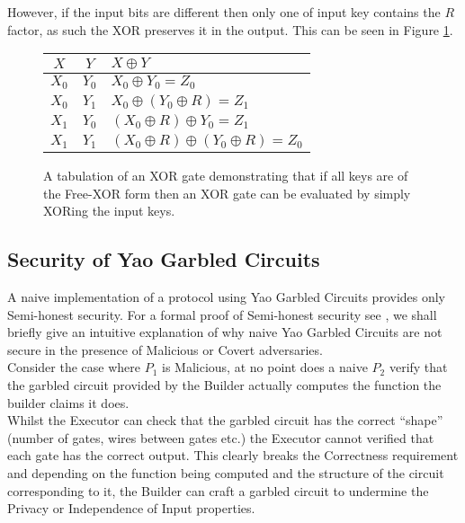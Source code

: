 \documentclass[ %
                    author={Nicholas Tutte},
                supervisor={Prof. Nigel Smart},
                    degree={MEng},
                     title={Secure Two Party Computation},
                  subtitle={A practical comparison of recent protocols},
                      type={Research - GG1K},
                      year={2015} ]{dissertation}
\begin{document}
				However, if the input bits are different then only one of input key contains the $R$ factor, as such the XOR preserves it in the output. This can be seen in Figure \ref{table:FREE_XOR_Demonstration}.
% 
				\begin{figure}[!ht]
					\begin{center}
						\begin{tabular}{c c | l }
							$X$ & $Y$ & $X \oplus Y$\\
							\hline
							$X_0$ & $Y_0$ & $X_0 \oplus Y_0 = Z_0$ \\
							$X_0$ & $Y_1$ & $X_0 \oplus (Y_0 \oplus R) = Z_1$ \\
							$X_1$ & $Y_0$ & $(X_0 \oplus R) \oplus Y_0 = Z_1$ \\
							$X_1$ & $Y_1$ & $(X_0 \oplus R) \oplus (Y_0 \oplus R) = Z_0$ \\
						\end{tabular}
					\end{center}
					\caption{A tabulation of an XOR gate demonstrating that if all keys are of the Free-XOR form then an XOR gate can be evaluated by simply XORing the input keys. \label{table:FREE_XOR_Demonstration}}
				\end{figure}

		\subsection{Security of Yao Garbled Circuits} \label{sub:YaoSecurity}
			A naive implementation of a protocol using Yao Garbled Circuits provides only Semi-honest security. For a formal proof of Semi-honest security see \cite{ProofOfYaoSecurity}, we shall briefly give an intuitive explanation of why naive Yao Garbled Circuits are not secure in the presence of Malicious or Covert adversaries.\\

			Consider the case where $P_1$ is Malicious, at no point does a naive $P_2$ verify that the garbled circuit provided by the Builder actually computes the function the builder claims it does.\\

			Whilst the Executor can check that the garbled circuit has the correct ``shape'' (number of gates, wires between gates etc.) the Executor cannot verified that each gate has the correct output. This clearly breaks the Correctness requirement and depending on the function being computed and the structure of the circuit corresponding to it, the Builder can craft a garbled circuit to undermine the Privacy or Independence of Input properties.\\
\end{document}
